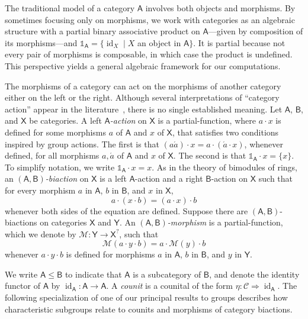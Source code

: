 \documentclass{amsart}
\newcommand{\Cat}[1]{\mathsf{#1}}
\newcommand{\cat}[1]{\Cat{#1}}
\newcommand{\acat}[1]{\mathsf{#1}}
\numberwithin{lstfloat}{section}
\DeclareMathOperator{\id}{id}
\newcommand{\one}{\mathbb{1}}
\renewcommand{\leq}{\leqslant}
\newcommand{\cA}{\cat{A}}
\renewcommand{\leq}{\leqslant}
\theoremstyle{definition}
\theoremstyle{remark}
\numberwithin{equation}{section}
\begin{document}
The traditional model of a category $\cA$ involves both objects and morphisms. By
sometimes focusing only on morphisms, we work with categories as an algebraic 
structure with a partial binary associative product on $\cA$---given by composition 
of its morphisms---and $\one_{\cA}=\{\id_X\mid X$ an object in $\cA\}$. It
is partial because not every pair of morphisms is composable, in which case the
product is undefined. 
This perspective yields a general algebraic framework for our computations.


The morphisms of a category can act on the morphisms of another category 
either on the
left or the right. Although several interpretations of ``category
action'' appear in the literature~, there is no single established
meaning.
Let $\acat{A}$, $\acat{B}$, and $\acat{X}$ be categories. 
A left \emph{$\acat{A}$-action} on $\acat{X}$ is a partial-function, where 
$a\cdot x$ is defined for some morphisms $a$ of $\acat{A}$ and $x$ of $\acat{X}$,
that satisfies two conditions inspired by group actions. The first is that  
$(a\acute{a})\cdot x=a\cdot (\acute{a}\cdot x)$, whenever defined, for all morphisms 
$a,\acute{a}$ of $\acat{A}$ and $x$ of $\acat{X}$.
The second is that 
$\one_{\acat{A}}\cdot x=\{x\}$. 
To simplify notation, we write $\one_{\acat{A}}\cdot x=x$.
As in the theory of bimodules of rings, an
\emph{$(\acat{A},\acat{B})$-biaction} on $\acat{X}$ is a left
$\acat{A}$-action and a right $\acat{B}$-action on $\acat{X}$ such 
that for every morphism $a$ in $\acat{A}$, $b$ in $\acat{B}$, and 
$x$ in $\acat{X}$,
\[ 
  a\cdot (x \cdot b) = (a \cdot x) \cdot b
\] 
whenever both sides of the equation are defined. 
Suppose there are $(\acat{A},\acat{B})$-biactions on categories 
$\acat{X}$ and $\acat{Y}$.  
An \emph{$(\cat{A},\cat{B})$-morphism} is a partial-function, which we denote by
$\mathcal{M}:{\acat{Y}}\to \acat{X}^?$, such that 
\[ 
  \mathcal{M}(a\cdot y\cdot b)=a\cdot \mathcal{M}(y)\cdot b
\] 
whenever $a\cdot y\cdot b$ is defined for morphisms $a$ in $\cat{A}$, 
$b$ in $\cat{B}$, and $y$ in $\acat{Y}$.
 

We write $\acat{A}\leq \acat{B}$
to indicate that $\acat{A}$ is a subcategory of $\acat{B}$, and denote 
the identity functor of $\acat{A}$
by $\id_{\acat{A}} : \acat{A} \to \acat{A}$.
A \emph{counit} is a counital of the form $\eta: \mathcal{C}\Rightarrow \id_\acat{A}$. The following specialization of one of our principal results to groups describes how characteristic subgroups relate to counits and morphisms of category biactions.\enlargethispage{0.6cm}
\end{document}
